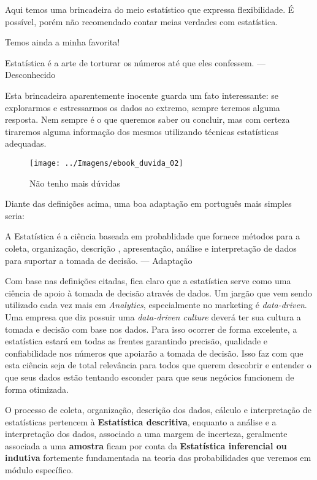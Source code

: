 \documentclass[11pt,]{style/krantz}
\renewenvironment{quote}{\begin{VF}}{\end{VF}}
\theoremstyle{definition}
\theoremstyle{definition}
\theoremstyle{definition}
\theoremstyle{remark}
\begin{document}
Aqui temos uma brincadeira do meio estatístico que expressa flexibilidade. É possível, porém não recomendado contar meias verdades com estatística.

Temos ainda a minha favorita!

\begin{quote}
Estatística é a arte de torturar os números até que eles confessem. --- Desconhecido
\end{quote}

Esta brincadeira aparentemente inocente guarda um fato interessante: se explorarmos e estressarmos os dados ao extremo, sempre teremos alguma resposta. Nem sempre é o que queremos saber ou concluir, mas com certeza tiraremos alguma informação dos mesmos utilizando técnicas estatísticas adequadas.

\begin{figure}[H]

{\centering \texttt{[image: ../Imagens/ebook\_duvida\_02]}

}

\caption{Não tenho mais dúvidas}\label{fig:fig02}
\end{figure}

Diante das definições acima, uma boa adaptação em português mais simples seria:

\begin{quote}
A Estatística é a ciência baseada em probablidade que fornece métodos para a coleta, organização, descrição , apresentação, análise e interpretação de dados para suportar a tomada de decisão. --- Adaptação
\end{quote}

Com base nas definições citadas, fica claro que a estatística serve como uma ciência de apoio à tomada de decisão através de dados. Um jargão que vem sendo utilizado cada vez mais em \emph{Analytics}, especialmente no marketing é \emph{data-driven}. Uma empresa que diz possuir uma \emph{data-driven culture} deverá ter sua cultura a tomada e decisão com base nos dados. Para isso ocorrer de forma excelente, a estatística estará em todas as frentes garantindo precisão, qualidade e confiabilidade nos números que apoiarão a tomada de decisão. Isso faz com que esta ciência seja de total relevância para todos que querem descobrir e entender o que seus dados estão tentando esconder para que seus negócios funcionem de forma otimizada.

O processo de coleta, organização, descrição dos dados, cálculo e interpretação de estatísticas pertencem à \textbf{Estatística descritiva}, enquanto a análise e a interpretação dos dados, associado a uma margem de incerteza, geralmente associada a uma \textbf{amostra} ficam por conta da \textbf{Estatística inferencial ou indutiva} fortemente fundamentada na teoria das probabilidades que veremos em módulo específico.
\end{document}
